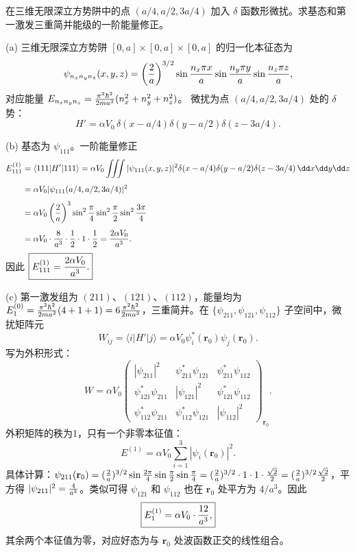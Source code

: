 \begin{question}
在三维无限深立方势阱中的点 $(a/4,a/2,3a/4)$ 加入 $\delta$ 函数形微扰。求基态和第一激发三重简并能级的一阶能量修正。
\end{question}
\begin{solution}
(a) 三维无限深立方势阱 $[0,a]\times[0,a]\times[0,a]$ 的归一化本征态为
\[
\psi_{n_xn_yn_z}(x,y,z)=\left({2\over a}\right)^{3/2}
\sin{n_x\pi x\over a}\sin{n_y\pi y\over a}\sin{n_z\pi z\over a},
\]
对应能量 $E_{n_xn_yn_z}={\pi^2\hbar^2\over2ma^2}(n_x^2+n_y^2+n_z^2)$。
微扰为点 $(a/4,a/2,3a/4)$ 处的 $\delta$ 势：
\[
H'=\alpha V_0\,\delta(x-a/4)\delta(y-a/2)\delta(z-3a/4).
\]

(b) 基态为 $\psi_{111}$。一阶能量修正
\[
\begin{aligned}
E_{111}^{(1)}&=\langle111|H'|111\rangle
=\alpha V_0\iiint|\psi_{111}(x,y,z)|^2
\delta(x-a/4)\delta(y-a/2)\delta(z-3a/4)\,\dd x\dd y\dd z \\[4pt]
&=\alpha V_0|\psi_{111}(a/4,a/2,3a/4)|^2 \\[4pt]
&=\alpha V_0\left({2\over a}\right)^{3}
\sin^2{\pi\over4}\sin^2{\pi\over2}\sin^2{3\pi\over4} \\[4pt]
&=\alpha V_0\cdot{8\over a^3}\cdot{1\over2}\cdot1\cdot{1\over2}
={2\alpha V_0\over a^3}.
\end{aligned}
\]
因此 $\boxed{E_{111}^{(1)}={2\alpha V_0\over a^3}.}$

(c) 第一激发组为 $(211)$、$(121)$、$(112)$，能量均为 $E_1^{(0)}={\pi^2\hbar^2\over2ma^2}(4+1+1)=6{\pi^2\hbar^2\over2ma^2}$，三重简并。在 $\{\psi_{211},\psi_{121},\psi_{112}\}$ 子空间中，微扰矩阵元
\[
W_{ij}=\langle i|H'|j\rangle
=\alpha V_0\psi_i^*(\mathbf r_0)\psi_j(\mathbf r_0).
\]
写为外积形式：
\[
W=\alpha V_0\begin{pmatrix}
|\psi_{211}|^2 & \psi_{211}^*\psi_{121} & \psi_{211}^*\psi_{112}\\[2pt]
\psi_{121}^*\psi_{211} & |\psi_{121}|^2 & \psi_{121}^*\psi_{112}\\[2pt]
\psi_{112}^*\psi_{211} & \psi_{112}^*\psi_{121} & |\psi_{112}|^2
\end{pmatrix}_{\mathbf r_0}.
\]
外积矩阵的秩为1，只有一个非零本征值：
\[
E^{(1)}=\alpha V_0\sum_{i=1}^3|\psi_i(\mathbf r_0)|^2.
\]
具体计算：$\psi_{211}(\mathbf r_0)=({2\over a})^{3/2}\sin{2\pi\over4}\sin{\pi\over2}\sin{\pi\over4}
=({2\over a})^{3/2}\cdot1\cdot1\cdot{\sqrt2\over2}=({2\over a})^{3/2}{\sqrt2\over2}$，平方得 $|\psi_{211}|^2={4\over a^3}$。类似可得 $\psi_{121}$ 和 $\psi_{112}$ 也在 $\mathbf r_0$ 处平方为 $4/a^3$。因此
\[
\boxed{E_1^{(1)}=\alpha V_0\cdot{12\over a^3},}
\]
其余两个本征值为零，对应好态为与 $\mathbf r_0$ 处波函数正交的线性组合。
\end{solution}

